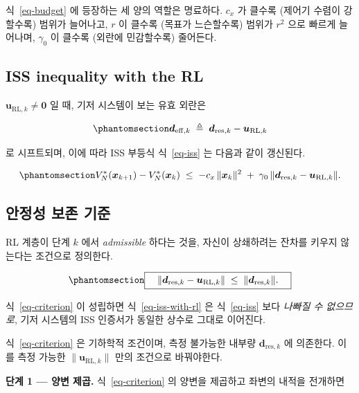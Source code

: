 \documentclass[
  11pt,
]{article}
\theoremstyle{plain}
\theoremstyle{plain}
\theoremstyle{definition}
\theoremstyle{remark}
\begin{document}
식~\ref{eq-budget} 에 등장하는 세 양의 역할은 명료하다. \(c_x\) 가
클수록 (제어기 수렴이 강할수록) 범위가 늘어나고, \(r\) 이 클수록 (목표가
느슨할수록) 범위가 \(r^2\) 으로 빠르게 늘어나며, \(\gamma_0\) 이 클수록
(외란에 민감할수록) 줄어든다.

\subsection{ISS inequality with the
RL}\label{iss-inequality-with-the-rl}

\(\bm{u}_{\mathrm{RL},k} \ne \bm{0}\) 일 때, 기저 시스템이 보는 유효
외란은

\begin{equation}\protect\phantomsection\label{eq-deff}{
\bm{d}_{\mathrm{eff},k}
\;\triangleq\;
\bm{d}_{\mathrm{res},k} - \bm{u}_{\mathrm{RL},k}
}\end{equation}

로 시프트되며, 이에 따라 ISS 부등식 식~\ref{eq-iss} 는 다음과 같이
갱신된다.

\begin{equation}\protect\phantomsection\label{eq-iss-with-rl}{
V_N^*(\bm{x}_{k+1}) - V_N^*(\bm{x}_k)
\;\le\;
-c_x\,\|\bm{x}_k\|^2
\;+\; \gamma_0\,\|\bm{d}_{\mathrm{res},k} - \bm{u}_{\mathrm{RL},k}\|.
}\end{equation}

\subsection{안정성 보존
기준}\label{uxc548uxc815uxc131-uxbcf4uxc874-uxae30uxc900}

RL 계층이 단계 \(k\) 에서 \emph{admissible} 하다는 것을, 자신이
상쇄하려는 잔차를 키우지 않는다는 조건으로 정의한다.

\begin{equation}\protect\phantomsection\label{eq-criterion}{
\boxed{\quad
\|\bm{d}_{\mathrm{res},k} - \bm{u}_{\mathrm{RL},k}\|
\;\le\; \|\bm{d}_{\mathrm{res},k}\|.
\quad}
}\end{equation}

식~\ref{eq-criterion} 이 성립하면 식~\ref{eq-iss-with-rl} 은
식~\ref{eq-iss} 보다 \emph{나빠질 수 없으므로}, 기저 시스템의 ISS
인증서가 동일한 상수로 그대로 이어진다.

식~\ref{eq-criterion} 은 기하학적 조건이며, 측정 불가능한 내부량
\(\bm{d}_{\mathrm{res},k}\) 에 의존한다. 이를 측정 가능한
\(\|\bm{u}_{\mathrm{RL},k}\|\) 만의 조건으로 바꿔야한다.

\textbf{단계 1 --- 양변 제곱.} 식~\ref{eq-criterion} 의 양변을 제곱하고
좌변의 내적을 전개하면
\end{document}
